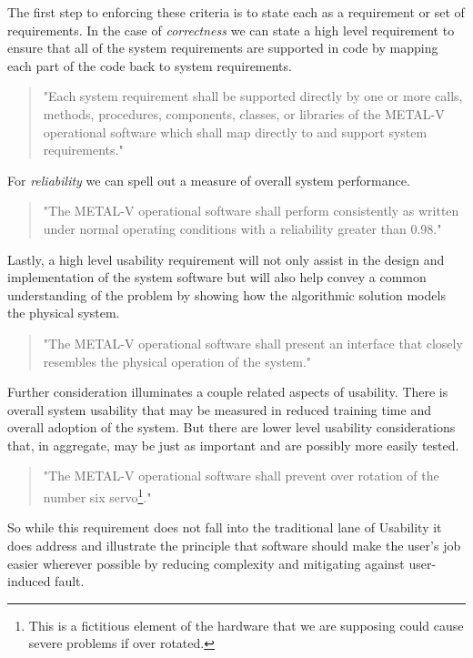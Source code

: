 \documentclass[letterpaper,10pt]{article}
\begin{document}
The first step to enforcing these criteria is to state each as a requirement or set of requirements.  In the case of \emph{correctness} we can state a high level requirement to ensure that all of the system requirements are supported in code by mapping each part of the code back to system requirements.
\begin{quote}
"Each system requirement shall be supported directly by one or more calls, methods, procedures, components,
classes, or libraries of the METAL-V operational software which shall map directly to and support system
requirements."
\end{quote}
For \emph{reliability} we can spell out a measure of overall system performance.
\begin{quote}
"The METAL-V operational software shall perform consistently as written under normal operating conditions
with a reliability greater than 0.98."
\end{quote}
Lastly, a high level usability requirement will not only assist in the design and implementation of the system software but will also help convey a common understanding of the problem by showing how the algorithmic solution models the physical system.
\begin{quote}
"The METAL-V operational software shall present an interface that closely resembles the physical operation
of the system."
\end{quote}
Further consideration illuminates a couple related aspects
of usability. There is overall system usability that may be measured in reduced training time and overall
adoption of the system. But there are lower level usability considerations that, in aggregate, may be just as
important and are possibly more easily tested.
\begin{quote}
"The METAL-V operational software shall prevent over rotation of the number six servo\footnote{This is a fictitious element of the hardware that we are supposing could cause severe problems if over rotated.}."
\end{quote}
So while this requirement does not fall into the traditional lane of Usability it does address and illustrate
the principle that software should make the user's job easier wherever possible by reducing complexity and mitigating against user-induced fault.
\end{document}
